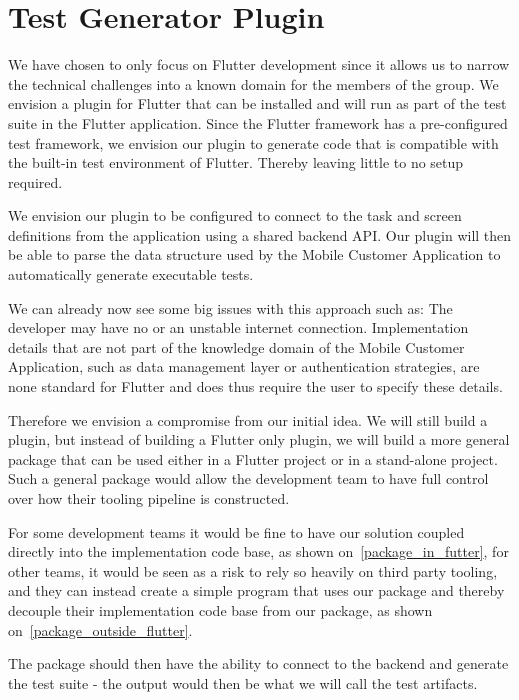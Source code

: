 \section{Test Generator Plugin}
We have chosen to only focus on Flutter development since it allows us to narrow the technical challenges into a known domain for the members of the group.
We envision a plugin for Flutter that can be installed and will run as part of the test suite in the Flutter application.
Since the Flutter framework has a pre-configured test framework, we envision our plugin to generate code that is compatible with the built-in test environment of Flutter.
Thereby leaving little to no setup required.

We envision our plugin to be configured to connect to the task and screen definitions from the application using a shared backend API.
Our plugin will then be able to parse the data structure used by the Mobile Customer Application to automatically generate executable tests.

We can already now see some big issues with this approach such as:
The developer may have no or an unstable internet connection.
Implementation details that are not part of the knowledge domain of the Mobile Customer Application, such as data management layer or authentication strategies, are none standard for Flutter and does thus require the user to specify these details.


Therefore we envision a compromise from our initial idea. 
We will still build a plugin, but instead of building a Flutter only plugin, we will build a more general package that can be used either in a Flutter project or in a stand-alone project.
Such a general package would allow the development team to have full control over how their tooling pipeline is constructed.

For some development teams it would be fine to have our solution coupled directly into the implementation code base, as shown on~\autoref{package_in_futter}, for other teams, it would be seen as a risk to rely so heavily on third party tooling, and they can instead create a simple program that uses our package and thereby decouple their implementation code base from our package, as shown on~\autoref{package_outside_flutter}. 

The package should then have the ability to connect to the backend and generate the test suite - the output would then be what we will call the test artifacts.

